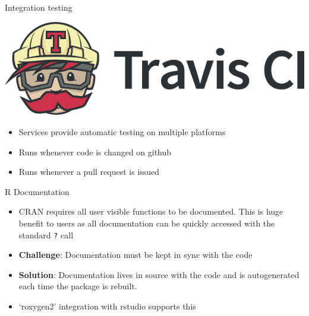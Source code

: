 \begin{frame}{Integration testing}

\includegraphics{travis_ci.png}

\begin{itemize}
\tightlist
\item
  Services provide automatic testing on multiple platforms
\item
  Runs whenever code is changed on github
\item
  Runs whenever a pull request is issued
\end{itemize}

\end{frame}

\begin{frame}{R Documentation}

\begin{itemize}[<+->]
\tightlist
\item
  CRAN requires all user visible functions to be documented. \newline
    This is huge benefit to users as all documentation can be quickly
  accessed with the standard \texttt{?} call
\item
  \textbf{Challenge}: Documentation must be kept in sync with the code
\item
  \textbf{Solution}: Documentation lives in source with the code and is
  autogenerated each time the package is rebuilt.\newline 
\item
  `roxygen2' integration with rstudio supports this
\end{itemize}

\end{frame}

